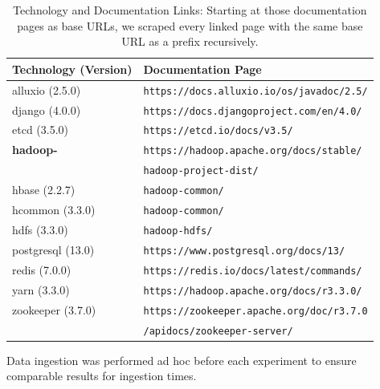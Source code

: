 \begin{table}[h]
    \centering
    \begin{tabular}{|l|l|}
        \hline
        \textbf{Technology (Version)} & \textbf{Documentation Page} \\
        \hline
        alluxio (2.5.0) & \texttt{https://docs.alluxio.io/os/javadoc/2.5/} \\
        django (4.0.0) & \texttt{https://docs.djangoproject.com/en/4.0/} \\
        etcd (3.5.0) & \texttt{https://etcd.io/docs/v3.5/} \\
        \textbf{hadoop-} & \texttt{https://hadoop.apache.org/docs/stable/}\\
        & \hspace{0.25cm} \texttt{hadoop-project-dist/} \\
        \hspace{0.15cm} hbase (2.2.7) & \hspace{0.5cm} \texttt{hadoop-common/} \\
        \hspace{0.15cm} hcommon (3.3.0) & \hspace{0.5cm} \texttt{hadoop-common/} \\
        \hspace{0.15cm} hdfs (3.3.0) & \hspace{0.5cm} \texttt{hadoop-hdfs/} \\
        postgresql (13.0) & \texttt{https://www.postgresql.org/docs/13/} \\
        redis (7.0.0) & \texttt{https://redis.io/docs/latest/commands/} \\
        yarn (3.3.0) & \texttt{https://hadoop.apache.org/docs/r3.3.0/} \\
        zookeeper (3.7.0) & \texttt{https://zookeeper.apache.org/doc/r3.7.0} \\
        & \hspace{0.25cm} \texttt{/apidocs/zookeeper-server/} \\
        \hline
    \end{tabular}
    \caption{Technology and Documentation Links: Starting at those documentation pages as base URLs, we scraped every linked page with the same base URL as a prefix recursively.}
    \label{tab:technology_documentation}
\end{table}

Data ingestion was performed ad hoc before each experiment to ensure comparable results for ingestion times.

